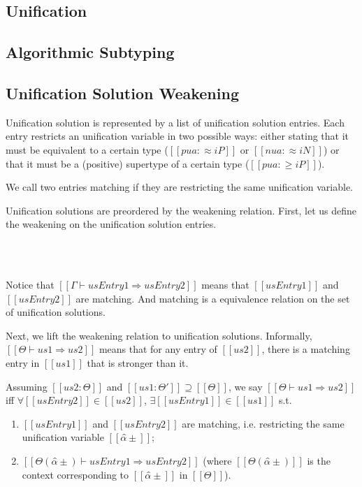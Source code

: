 \documentclass[a4,natbib=false]{article}
\begin{document}

\subsection{Unification}
\ottdefnsU

\subsection{Algorithmic Subtyping}
\ottdefnsA

\subsection{Unification Solution Weakening}

Unification solution is represented by a list of unification solution entries.
Each entry restricts an unification variable in two possible ways: either
stating that it must be equivalent to a certain type ($[[pua :≈ iP]]$ or $[[nua
:≈ iN]]$) or that it must be a (positive) supertype of a certain type ($[[pua :≥ iP]]$).

\begin{definition} 
  We call two entries matching if they are restricting the same unification variable.
\end{definition}

Unification solutions are preordered by the weakening relation.
First, let us define the weakening on the unification solution entries.\\

\begin{definition} \hfill \\
\ottdefnSImpE{}\\
\end{definition}
Notice that  $[[Γ ⊢ usEntry1 ⇒ usEntry2]]$ means that $[[usEntry1]]$ and $[[usEntry2]]$ are matching. And 
matching is a equivalence relation on the set of unification solutions. 

Next, we lift the weakening relation to unification solutions.
Informally, $[[Θ ⊢ us1 ⇒ us2]]$ means that for any entry of $[[us2]]$,
there is a matching entry in $[[us1]]$ that is stronger than it. 

\begin{definition}
  Assuming $[[us2 : Θ]]$ and $[[us1 : Θ']] \supseteq [[Θ]]$,
  we say $[[Θ ⊢ us1 ⇒ us2]]$ iff
  $\forall [[usEntry2]] \in [[us2]]$, $\exists [[usEntry1]] \in [[us1]]$ s.t.
  \begin{enumerate}
    \item $[[usEntry1]]$ and $[[usEntry2]]$ are matching, i.e. restricting the same unification variable $[[α̂±]]$;
    \item $[[Θ(α̂±) ⊢ usEntry1 ⇒ usEntry2]]$ (where $[[Θ(α̂±)]]$ is the context corresponding to $[[α̂±]]$ in $[[Θ]]$).
  \end{enumerate}
\end{definition}
\end{document}
